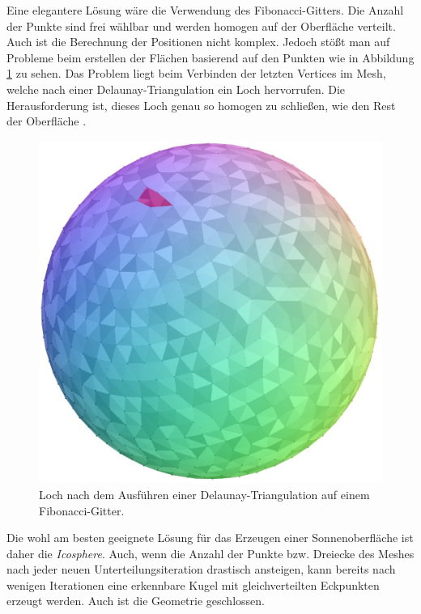 Eine elegantere Lösung wäre die Verwendung des Fibonacci-Gitters. Die Anzahl
der Punkte sind frei wählbar und werden homogen auf der Oberfläche verteilt.
Auch ist die Berechnung der Positionen nicht komplex. Jedoch stößt man auf
Probleme beim erstellen der Flächen basierend auf den Punkten wie in
Abbildung \ref{fig:fibo-lattice-hole} zu sehen. Das Problem liegt beim
Verbinden der letzten Vertices im Mesh, welche nach einer
Delaunay-Triangulation ein Loch hervorrufen. Die Herausforderung ist, dieses
Loch genau so homogen zu schließen, wie den Rest der Oberfläche
\cite{RedBlobGames}.

\begin{figure}
  \includegraphics[width=0.6\columnwidth]{fibonacci-sphere-hole}
  \caption{Loch nach dem Ausführen einer Delaunay-Triangulation auf einem Fibonacci-Gitter.}
  \label{fig:fibo-lattice-hole}
\end{figure}

Die wohl am besten geeignete Lösung für das Erzeugen einer Sonnenoberfläche
ist daher die \textit{Icosphere}. Auch, wenn die Anzahl der Punkte bzw. Dreiecke
des Meshes nach jeder neuen Unterteilungsiteration drastisch ansteigen, kann bereits
nach wenigen Iterationen eine erkennbare Kugel mit gleichverteilten Eckpunkten erzeugt
werden. Auch ist die Geometrie geschlossen.